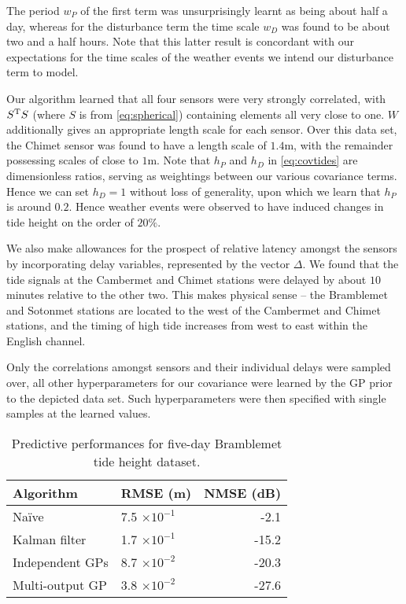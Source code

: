 \documentclass{acmtrans2m}
\newcommand{\dnt}[1]{_{{#1}}}
\begin{document}
The period $w_P$ of the first term was unsurprisingly learnt as being about half a day, whereas for the disturbance term the time scale $w\dnt{D}$ was found to be about two and a half hours. Note that this latter result is concordant with our expectations for the time scales of the weather events we intend our disturbance term to model. 

Our algorithm learned that all four sensors were very strongly correlated, with $S^{\mathrm{T}} S$ (where $S$ is from \eqref{eq:spherical})  containing elements all very close to one. $W$ additionally gives an appropriate length scale for each sensor. Over this data set, the Chimet sensor was found to have a length scale of $1.4$m, with the remainder possessing scales of close to $1$m. Note that $h\dnt{P}$ and $h\dnt{D}$ in \eqref{eq:covtides} are dimensionless ratios, serving as weightings between our various covariance terms. Hence we can set $h\dnt{D}=1$ without loss of generality, upon which we learn that $h\dnt{P}$ is around $0.2$. Hence weather events were observed to have induced changes in tide height on the order of $20\%$.

We also make allowances for the prospect of relative latency amongst the sensors by incorporating delay variables, represented by the vector $\Delta$. We found that the tide signals at the Cambermet and Chimet stations were delayed by about $10$ minutes relative to the other two. This makes physical sense -- the Bramblemet and Sotonmet stations are located to the west of the Cambermet and Chimet stations, and the timing of high tide increases from west to east within the English channel.

Only the correlations amongst sensors and their individual delays were sampled over, all other hyperparameters for our covariance were learned by the GP prior to the depicted data set. Such hyperparameters were then specified with single samples at the learned values.

\begin{table}
\centering
\caption{Predictive performances for five-day Bramblemet tide height dataset.}
\label{tbl:TH_RMSEs}
 \begin{tabular}{@{}llr@{}}
 \\
 \toprule
Algorithm & RMSE (m) & NMSE (dB)\\
\midrule
Na\"{i}ve & 7.5 $\times 10^{-1}$ & -2.1 \\
Kalman filter & 1.7 $\times 10^{-1}$ & -15.2 \\
Independent GPs & 8.7 $\times 10^{-2}$ & -20.3 \\
Multi-output GP & 3.8 $\times 10^{-2}$ & -27.6 \\
\bottomrule
\end{tabular}
\end{table}
\end{document}
